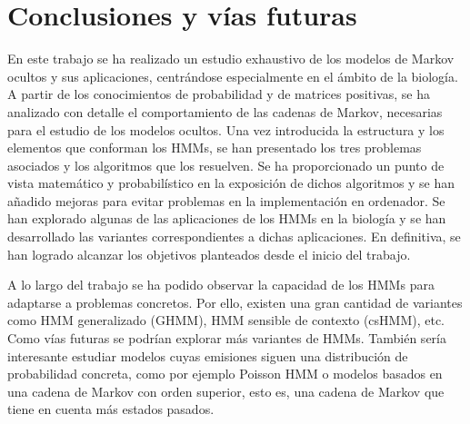 \chapter*{Conclusiones y vías futuras}

En este trabajo se ha realizado un estudio exhaustivo de los modelos de Markov ocultos y sus aplicaciones, centrándose especialmente en el ámbito de la biología. A partir de los conocimientos de probabilidad y de matrices positivas, se ha analizado con detalle el comportamiento de las cadenas de Markov, necesarias para el estudio de los modelos ocultos. Una vez introducida la estructura y los elementos que conforman los HMMs, se han presentado los tres problemas asociados y los algoritmos que los resuelven. Se ha proporcionado un punto de vista matemático y probabilístico en la exposición de dichos algoritmos y se han añadido mejoras para evitar problemas en la implementación en ordenador. Se han explorado algunas de las aplicaciones de los HMMs en la biología y se han desarrollado las variantes correspondientes a dichas aplicaciones. En definitiva, se han logrado alcanzar los objetivos planteados desde el inicio del trabajo.

A lo largo del trabajo se ha podido observar la capacidad de los HMMs para adaptarse a problemas concretos. Por ello, existen una gran cantidad de variantes como HMM generalizado (GHMM), HMM sensible de contexto (csHMM), etc. Como vías futuras se podrían explorar más variantes de HMMs. También sería interesante estudiar modelos cuyas emisiones siguen una distribución de probabilidad concreta, como por ejemplo Poisson HMM o modelos basados en una cadena de Markov con orden superior, esto es, una cadena de Markov que tiene en cuenta más estados pasados.